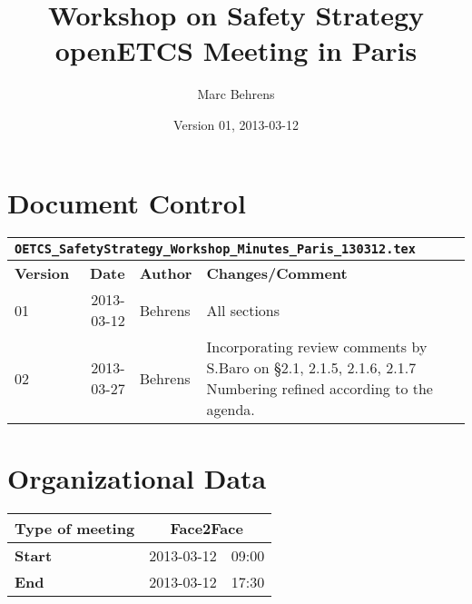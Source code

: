 \documentclass[a4paper]{article}
\begin{document}
\title{Workshop on Safety Strategy  \\openETCS Meeting in Paris}
\author{Marc Behrens}
\date{Version 01, 2013-03-12}


\maketitle


\section*{Document Control}

\begin{tabular}{|l|r|p{}|p{}|}
\hline
\multicolumn{4}{|l|}{\texttt{OETCS\_SafetyStrategy\_Workshop\_Minutes\_Paris\_130312.tex}}
\\\hline
\textbf{Version} & \textbf{Date} & \textbf{Author} & \textbf{Changes/Comment}
\\\hline
01 & 2013-03-12 & Behrens & All sections  
\\\hline
02 & 2013-03-27 & Behrens & Incorporating review comments by S.Baro on \S 2.1, 2.1.5, 2.1.6, 2.1.7  \newline Numbering refined according to the agenda.  
\\\hline
\end{tabular}

\section*{Organizational Data}

\begin{tabular}{|l|r|r|}
\hline
\textbf{Type of meeting} & \multicolumn{2}{|c|}{Face2Face}
\\\hline
\textbf{Start} & 2013-03-12 & 09:00
\\\hline
 \textbf{End} & 2013-03-12 & 17:30
\\\hline
\end{tabular}

\medskip\noindent%
\end{document}
